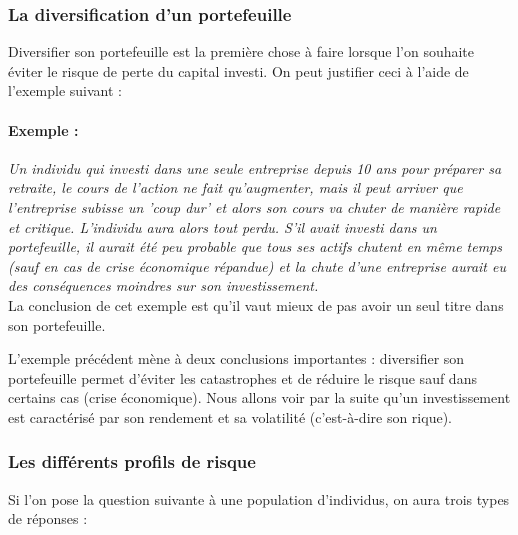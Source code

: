 \subsubsection{La diversification d'un portefeuille}
Diversifier son portefeuille est la première chose à faire lorsque l'on souhaite éviter le risque de perte du capital investi. On peut justifier ceci à l'aide de l'exemple suivant :

\paragraph{Exemple :} \textit{Un individu qui investi dans une seule entreprise depuis 10 ans pour préparer sa retraite, le cours de l'action ne fait qu'augmenter, mais il peut arriver que l'entreprise subisse un 'coup dur' et alors son cours va chuter de manière rapide et critique. L'individu aura alors tout perdu.
	  S'il avait investi dans un portefeuille, il aurait été peu probable que tous ses actifs chutent en même temps (sauf en cas de crise économique répandue) et la chute d'une entreprise aurait eu des conséquences moindres sur son investissement.}\\
La conclusion de cet exemple est qu'il vaut mieux de pas avoir un seul titre dans son portefeuille.

L'exemple précédent mène à deux conclusions importantes : diversifier son portefeuille permet d'éviter les catastrophes et de réduire le risque sauf dans certains cas (crise économique).
Nous allons voir par la suite qu'un investissement est caractérisé par son rendement et sa volatilité (c'est-à-dire son rique).

\subsubsection{Les différents profils de risque}
Si l'on pose la question suivante à une population d'individus, on aura trois types de réponses :\\

